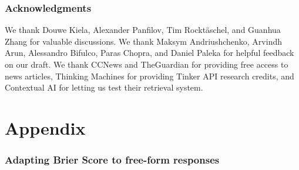 \documentclass{article} %
\begin{document}


\section*{Acknowledgments}
\label{sec:acknowledgments}

 We thank Douwe Kiela, Alexander Panfilov, Tim Rockt{\"a}schel, and Guanhua Zhang for valuable discussions. We thank Maksym Andriushchenko, Arvindh Arun, Alessandro Bifulco, Paras Chopra, and Daniel Paleka for helpful feedback on our draft. We thank CCNews and TheGuardian for providing free access to news articles, Thinking Machines for providing Tinker API research credits, and Contextual AI for letting us test their retrieval system.






\newpage
\appendix
\part{Appendix}

\localtableofcontents
\clearpage


\section{Adapting Brier Score to free-form responses}
\label{sec:freeform_brier}
\end{document}
